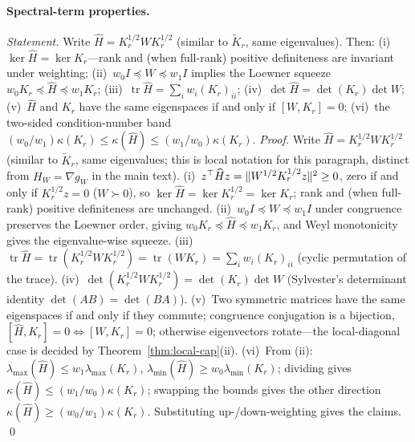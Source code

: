 \documentclass[11pt]{article}
\DeclarePairedDelimiter{\norm}{\lVert}{\rVert}
\newcommand{\W}{W}
\DeclareMathOperator{\tr}{tr}
\numberwithin{equation}{section}
\begin{document}
\paragraph{Spectral-term properties.}
\emph{Statement.} Write $\widehat H=K_r^{1/2}\W K_r^{1/2}$ (similar to $\widetilde K_r$, same eigenvalues). Then: (i)~$\ker\widehat H=\ker K_r$---rank and (when full-rank) positive definiteness are invariant under weighting; (ii)~$w_0I\preceq\W\preceq w_1I$ implies the Loewner squeeze $w_0K_r\preceq\widehat H\preceq w_1K_r$; (iii)~$\tr\widehat H=\sum_iw_i(K_r)_{ii}$; (iv)~$\det\widehat H=\det(K_r)\det\W$; (v)~$\widehat H$ and $K_r$ have the same eigenspaces if and only if $[\W,K_r]=0$; (vi)~the two-sided condition-number band $(w_0/w_1)\kappa(K_r)\le\kappa(\widehat H)\le(w_1/w_0)\kappa(K_r)$.
\emph{Proof.} Write $\widehat H=K_r^{1/2}\W K_r^{1/2}$ (similar to $\widetilde K_r$, same eigenvalues; this is local notation for this paragraph, distinct from $H_\W=\nabla g_\W$ in the main text). (i)~$z^\top\widehat Hz=\norm{\W^{1/2}K_r^{1/2}z}^2\ge0$, zero if and only if $K_r^{1/2}z=0$ ($\W\succ0$), so $\ker\widehat H=\ker K_r^{1/2}=\ker K_r$; rank and (when full-rank) positive definiteness are unchanged. (ii)~$w_0I\preceq\W\preceq w_1I$ under congruence preserves the Loewner order, giving $w_0K_r\preceq\widehat H\preceq w_1K_r$, and Weyl monotonicity gives the eigenvalue-wise squeeze. (iii)~$\tr\widehat H=\tr(K_r^{1/2}\W K_r^{1/2})=\tr(\W K_r)=\sum_iw_i(K_r)_{ii}$ (cyclic permutation of the trace). (iv)~$\det(K_r^{1/2}\W K_r^{1/2})=\det(K_r)\det\W$ (Sylvester's determinant identity $\det(AB)=\det(BA)$). (v)~Two symmetric matrices have the same eigenspaces if and only if they commute; congruence conjugation is a bijection, $[\widehat H,K_r]=0\iff[\W,K_r]=0$; otherwise eigenvectors rotate---the local-diagonal case is decided by Theorem~\ref{thm:local-cap}(ii). (vi)~From (ii): $\lambda_{\max}(\widehat H)\le w_1\lambda_{\max}(K_r)$, $\lambda_{\min}(\widehat H)\ge w_0\lambda_{\min}(K_r)$; dividing gives $\kappa(\widehat H)\le(w_1/w_0)\kappa(K_r)$; swapping the bounds gives the other direction $\kappa(\widehat H)\ge(w_0/w_1)\kappa(K_r)$. Substituting up-/down-weighting gives the claims. \qed
\end{document}
